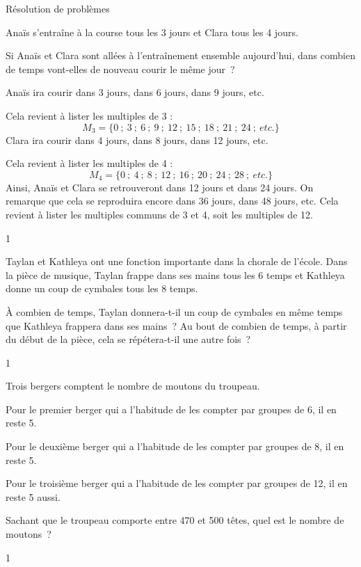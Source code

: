 \documentclass[a4paper,11pt]{report}
\begin{document}
\begin{resolu}{Résolution de problèmes}{

    Anaïs s'entraîne à la course tous les 3 jours et Clara tous les 4 jours. 

    Si Anaïs et Clara sont allées à l'entraînement ensemble aujourd'hui, dans combien de temps vont-elles de nouveau courir le même jour~? 

    {\color{blue}
        Anaïs ira courir dans 3 jours, dans 6 jours, dans 9 jours, etc. 

	Cela revient à lister les multiples de 3 : 
	\[M_3=\{0~;~3~;~6~;~9~;~12~;~15~;~18~;~21~;~24~;~etc.\}\]
        Clara ira courir dans 4 jours, dans 8 jours, dans 12 jours, etc. 

	Cela revient à lister les multiples de 4 :
	\[M_4=\{0~;~4~;~8~;~12~;~16~;~20~;~24~;~28~;~etc.\}\] 
        Ainsi, Anaïs et Clara se retrouveront dans 12 jours et dans 24 jours. On remarque que cela se reproduira encore dans 36 jours, dans 48 jours, etc. Cela revient à lister les multiples communs de 3 et 4, soit les multiples de 12. 
    }
}{1}\end{resolu}

\begin{exo}{
    Taylan et Kathleya ont une fonction importante dans la chorale de l'école.  Dans la pièce de musique, Taylan frappe dans ses mains tous les 6 temps et Kathleya donne un coup de cymbales tous les 8 temps.
    \begin{tasks}
        \task À combien de temps, Taylan donnera-t-il un coup de cymbales en même temps que Kathleya frappera dans ses mains~?
        \task Au bout de combien de temps, à partir du début de la pièce, cela se répétera-t-il une autre fois~?
    \end{tasks}
}{1}\end{exo}



\begin{exo}{
    Trois bergers comptent le nombre de moutons du troupeau.

    Pour le premier berger qui a l'habitude de les compter par groupes de 6, il en reste 5. 

    Pour le deuxième berger qui a l'habitude de les compter par groupes de 8, il en reste 5.

    Pour le troisième berger qui a l'habitude de les compter par groupes de 12, il en reste 5 aussi. 

Sachant que le troupeau comporte entre 470 et 500 têtes, quel est le nombre de moutons~?

}{1}\end{exo}
\end{document}
